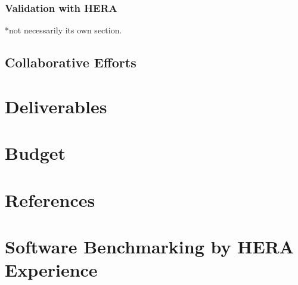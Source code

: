 \documentclass[]{article}
\begin{document}
\subsubsection{Validation with HERA}
*not necessarily its own section.
\subsection{Collaborative Efforts}

\section{Deliverables}

\section{Budget}

\section{References}



%

\appendix
\section{Software Benchmarking by HERA Experience}

\end{document}
